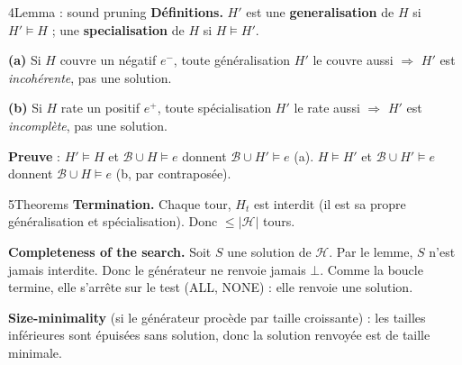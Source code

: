 \documentclass[10pt]{article}
\begin{document}
\begin{minipage}[t]{0.5\textwidth}
\begin{bloc}{\num{4}Lemma : sound pruning}
\textbf{Définitions.} $H'$ est une \textbf{generalisation} de $H$ si $H'\models H$ ; une \textbf{specialisation} de $H$ si $H\models H'$.\par\vspace{2pt}
\textbf{(a)} Si $H$ couvre un négatif $e^-$, toute généralisation $H'$ le couvre aussi $\Rightarrow$ $H'$ est \emph{incohérente}, pas une solution.\par\vspace{2pt}
\textbf{(b)} Si $H$ rate un positif $e^+$, toute spécialisation $H'$ le rate aussi $\Rightarrow$ $H'$ est \emph{incomplète}, pas une solution.\par\vspace{2pt}
\textbf{Preuve} : $H'\models H$ et $\mathcal{B}\cup H\models e$ donnent $\mathcal{B}\cup H'\models e$ (a). $H\models H'$ et $\mathcal{B}\cup H'\models e$ donnent $\mathcal{B}\cup H\models e$ (b, par contraposée).
\end{bloc}
\end{minipage}\hfill
\begin{minipage}[t]{0.48\textwidth}
\begin{bloc}{\num{5}Theorems}
\textbf{Termination.} Chaque tour, $H_t$ est interdit (il est sa propre généralisation et spécialisation). Donc $\le|\mathcal{H}|$ tours.\par\vspace{3pt}
\textbf{Completeness of the search.} Soit $S$ une solution de $\mathcal{H}$. Par le lemme, $S$ n'est jamais interdite. Donc le générateur ne renvoie jamais $\bot$. Comme la boucle termine, elle s'arrête sur le test (ALL, NONE) : elle renvoie une solution.\par\vspace{3pt}
\textbf{Size-minimality} (si le générateur procède par taille croissante) : les tailles inférieures sont épuisées sans solution, donc la solution renvoyée est de taille minimale.
\end{bloc}
\end{minipage}

\vspace{4pt}
\end{document}
